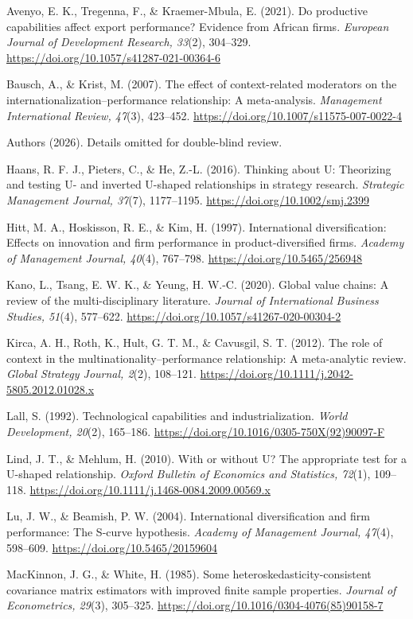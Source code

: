 \documentclass[
  12pt,a4paper]{article}
\begin{document}
Avenyo, E. K., Tregenna, F., \& Kraemer-Mbula, E. (2021). Do productive
capabilities affect export performance? Evidence from African firms.
\emph{European Journal of Development Research, 33}(2), 304--329.
\url{https://doi.org/10.1057/s41287-021-00364-6}

Bausch, A., \& Krist, M. (2007). The effect of context-related
moderators on the internationalization--performance relationship: A
meta-analysis. \emph{Management International Review, 47}(3), 423--452.
\url{https://doi.org/10.1007/s11575-007-0022-4}

Authors (2026). Details omitted for double-blind review.

Haans, R. F. J., Pieters, C., \& He, Z.-L. (2016). Thinking about U:
Theorizing and testing U- and inverted U-shaped relationships in
strategy research. \emph{Strategic Management Journal, 37}(7),
1177--1195. \url{https://doi.org/10.1002/smj.2399}

Hitt, M. A., Hoskisson, R. E., \& Kim, H. (1997). International
diversification: Effects on innovation and firm performance in
product-diversified firms. \emph{Academy of Management Journal, 40}(4),
767--798. \url{https://doi.org/10.5465/256948}

Kano, L., Tsang, E. W. K., \& Yeung, H. W.-C. (2020). Global value
chains: A review of the multi-disciplinary literature. \emph{Journal of
International Business Studies, 51}(4), 577--622.
\url{https://doi.org/10.1057/s41267-020-00304-2}

Kirca, A. H., Roth, K., Hult, G. T. M., \& Cavusgil, S. T. (2012). The
role of context in the multinationality--performance relationship: A
meta-analytic review. \emph{Global Strategy Journal, 2}(2), 108--121.
\url{https://doi.org/10.1111/j.2042-5805.2012.01028.x}

Lall, S. (1992). Technological capabilities and industrialization.
\emph{World Development, 20}(2), 165--186.
\url{https://doi.org/10.1016/0305-750X(92)90097-F}

Lind, J. T., \& Mehlum, H. (2010). With or without U? The appropriate
test for a U-shaped relationship. \emph{Oxford Bulletin of Economics and
Statistics, 72}(1), 109--118.
\url{https://doi.org/10.1111/j.1468-0084.2009.00569.x}

Lu, J. W., \& Beamish, P. W. (2004). International diversification and
firm performance: The S-curve hypothesis. \emph{Academy of Management
Journal, 47}(4), 598--609. \url{https://doi.org/10.5465/20159604}

MacKinnon, J. G., \& White, H. (1985). Some
heteroskedasticity-consistent covariance matrix estimators with improved
finite sample properties. \emph{Journal of Econometrics, 29}(3),
305--325. \url{https://doi.org/10.1016/0304-4076(85)90158-7}
\end{document}
